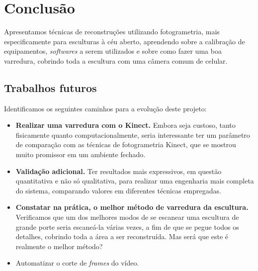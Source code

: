 \chapter*{Conclusão}
Apresentamos técnicas de reconstruções utilizando fotogrametria, mais especificamente para esculturas à céu aberto, aprendendo sobre a calibração de equipamentos, {\it softwares} a serem utilizados e sobre como fazer uma boa varredura, cobrindo toda a escultura com uma câmera comum de celular.

\section*{Trabalhos futuros} Identificamos os seguintes caminhos para a evolução deste projeto:
\begin{itemize}
\item \textbf{Realizar uma varredura com o Kinect.} Embora seja custoso, tanto fisicamente quanto computacionalmente, seria interessante ter um parâmetro de comparação com as técnicas de fotogrametria Kinect, que se mostrou muito promissor em um ambiente fechado.
 \item \textbf{Validação adicional.} Ter resultados mais expressivos, em questão quantitativa e não só qualitativa, para realizar uma engenharia mais completa do sistema, comparando valores em diferentes técnicas empregadas.
\item \textbf{Constatar na prática, o melhor método de varredura da escultura.} Verificamos que um dos melhores modos de se escanear uma escultura de grande porte seria escaneá-la várias vezes, a fim de que se pegue todos os detalhes, cobrindo toda a área a ser reconstruída. Mas será que este é realmente o melhor método? 
\item Automatizar o corte de {\it frames} do vídeo.
\end{itemize}
